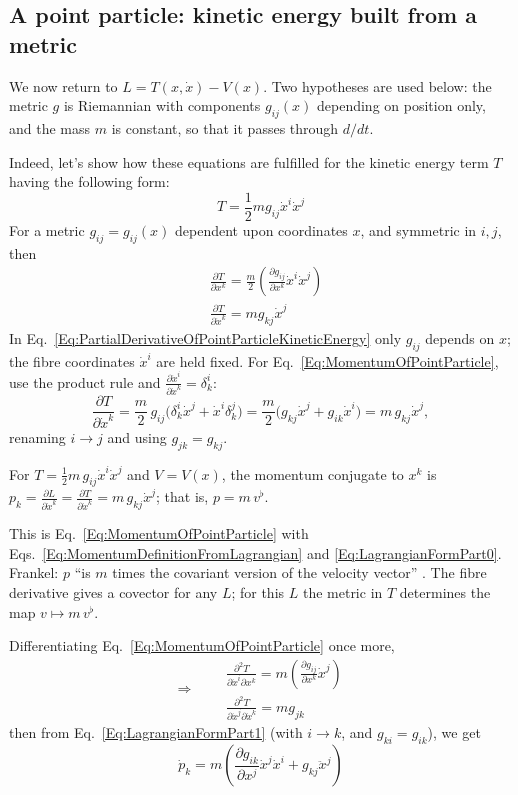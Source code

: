 \subsection{A point particle: kinetic energy built from a metric}
We now return to $L=T(x,\dot x)-V(x)$. Two hypotheses are used below: the
metric $g$ is Riemannian with components $g_{ij}(x)$ depending on position
only, and the mass $m$ is constant, so that it passes through $d/dt$.

Indeed, let's show how these equations are fulfilled for the kinetic energy
term $T$ having the following form:
\[
T = \frac{1}{2} m g_{ij} \dot{x}^i \dot{x}^j
\]
For a metric $g_{ij} = g_{ij}(x)$ dependent upon coordinates $x$, and
symmetric in $i,j$, then
\begin{align}
& \frac{ \partial T}{\partial x^k}
  = \frac{m}{2} \left( \frac{ \partial g_{ij}}{ \partial x^k}
    \dot{x}^i \dot{x}^j \right)
  \label{Eq:PartialDerivativeOfPointParticleKineticEnergy} \\
& \frac{ \partial T}{ \partial \dot{x}^k} = m g_{kj} \dot{x}^j
  \label{Eq:MomentumOfPointParticle}
\end{align}
In Eq.~\ref{Eq:PartialDerivativeOfPointParticleKineticEnergy} only $g_{ij}$
depends on $x$; the fibre coordinates $\dot x^i$ are held fixed. For
Eq.~\ref{Eq:MomentumOfPointParticle}, use the product rule and
$\frac{\partial\dot x^i}{\partial\dot x^k}=\delta^i_k$:
\[
 \frac{\partial T}{\partial\dot x^k}
 =\frac{m}{2}\,g_{ij}\bigl(\delta^i_k\dot x^j+\dot x^i\delta^j_k\bigr)
 =\frac{m}{2}\bigl(g_{kj}\dot x^j+g_{ik}\dot x^i\bigr)
 =m\,g_{kj}\dot x^j ,
\]
renaming $i\to j$ and using $g_{jk}=g_{kj}$.

\begin{proposition}\label{prop:momentum-covector}
For $T=\tfrac12m\,g_{ij}\dot x^i\dot x^j$ and $V=V(x)$, the momentum
conjugate to $x^k$ is
$p_k=\frac{\partial L}{\partial \dot x^k}=\frac{\partial T}{\partial \dot x^k}
=m\,g_{kj}\dot x^j$; that is, $p=m\,v^\flat$.
\end{proposition}

\noindent This is Eq.~\ref{Eq:MomentumOfPointParticle} with
Eqs.~\ref{Eq:MomentumDefinitionFromLagrangian} and
\ref{Eq:LagrangianFormPart0}. Frankel: $p$ ``is $m$ times the covariant
version of the velocity vector'' \cite[Section O.f]{frankel}. The fibre
derivative gives a covector for any $L$; for this $L$ the metric in $T$
determines the map $v\mapsto m\,v^\flat$.

Differentiating Eq.~\ref{Eq:MomentumOfPointParticle} once more,
\[
\Longrightarrow \quad
\begin{aligned}
& \frac{ \partial^2 T}{ \partial \dot{x}^i \partial x^k}
  = m \left( \frac{\partial g_{ij} }{ \partial x^k}  \dot{x}^j \right)\\
& \frac{ \partial^2 T}{ \partial \dot{x}^j \partial \dot{x}^k } = m g_{jk}
\end{aligned}
\]
then from Eq.~\ref{Eq:LagrangianFormPart1} (with $i\to k$, and
$g_{ki}=g_{ik}$), we get
\begin{equation}\label{Eq:MomentumInTermsOfMetricAndCoordinates}
\dot{p}_k = m \left( \frac{\partial g_{ik} }{ \partial x^j}
  \dot{x}^j \dot{x}^i + g_{kj} \ddot{x}^j \right)
\end{equation}

